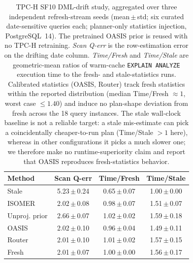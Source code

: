 \begin{table}[t]
\centering
\small
\caption{TPC-H SF10 DML-drift study, aggregated over three independent refresh-stream seeds (mean\,$\pm$\,std; six curated date-sensitive queries each; planner-only statistics injection, PostgreSQL~14). The pretrained OASIS prior is reused with no TPC-H retraining. \emph{Scan Q-err} is the row-estimation error on the drifting date column. \emph{Time/Fresh} and \emph{Time/Stale} are geometric-mean ratios of warm-cache \texttt{EXPLAIN ANALYZE} execution time to the fresh- and stale-statistics runs. Calibrated statistics (OASIS, Router) track fresh statistics within the reported distribution (median Time/Fresh $\approx 1$, worst case $\le 1.40$) and induce no plan-shape deviation from fresh across the 18 query instances. The stale wall-clock baseline is not a reliable target: a stale mis-estimate can pick a coincidentally cheaper-to-run plan (Time/Stale $>1$ here), whereas in other configurations it picks a much slower one; we therefore make no runtime-superiority claim and report that OASIS reproduces fresh-statistics behavior.}
\label{tab:tpch_runtime}
\setlength{\tabcolsep}{5pt}
\begin{tabular}{lccc}
\toprule
Method & Scan Q-err & Time/Fresh & Time/Stale \\
\midrule
Stale & 5.23\,$\pm$\,0.24 & 0.65\,$\pm$\,0.07 & 1.00\,$\pm$\,0.00 \\
ISOMER & 2.02\,$\pm$\,0.08 & 0.98\,$\pm$\,0.07 & 1.51\,$\pm$\,0.07 \\
Unproj. prior & 2.66\,$\pm$\,0.07 & 1.02\,$\pm$\,0.02 & 1.59\,$\pm$\,0.18 \\
OASIS & 2.02\,$\pm$\,0.10 & 0.96\,$\pm$\,0.04 & 1.49\,$\pm$\,0.11 \\
Router & 2.01\,$\pm$\,0.10 & 1.01\,$\pm$\,0.02 & 1.57\,$\pm$\,0.15 \\
Fresh & 2.01\,$\pm$\,0.07 & 1.00\,$\pm$\,0.00 & 1.56\,$\pm$\,0.17 \\
\bottomrule
\end{tabular}
\end{table}
